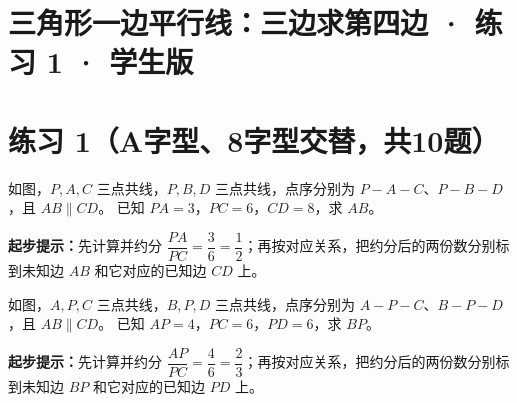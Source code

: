 \documentclass{exam-zh}
\begin{document}
\section*{三角形一边平行线：三边求第四边 · 练习 1 · 学生版}

\section*{练习 1（A字型、8字型交替，共10题）}


\begin{problem}[points=10]
  \noindent
  \begin{minipage}[t]{\dimexpr\linewidth-60mm-6mm\relax}
    \vspace{0pt}
    如图，$P,A,C$ 三点共线，$P,B,D$ 三点共线，点序分别为 $P-A-C$、$P-B-D$，且 $AB\parallel CD$。
已知 $PA=3$，$PC=6$，$CD=8$，求 $AB$。
    \begin{hintbox}
\textbf{起步提示：}先计算并约分 $\dfrac{PA}{PC}=\dfrac{3}{6}=\dfrac{1}{2}$；再按对应关系，把约分后的两份数分别标到未知边 $AB$ 和它对应的已知边 $CD$ 上。\end{hintbox}

  \end{minipage}\hfill
  \begin{diagramcoltikz}{60mm}{先看平行边方向，再判断 A 字型或 8 字型及对应边。}
  }
  \end{diagramcoltikz}
  \par\medskip
  \answerarea[42mm]
\end{problem}



\begin{problem}[points=10]
  \noindent
  \begin{minipage}[t]{\dimexpr\linewidth-60mm-6mm\relax}
    \vspace{0pt}
    如图，$A,P,C$ 三点共线，$B,P,D$ 三点共线，点序分别为 $A-P-C$、$B-P-D$，且 $AB\parallel CD$。
已知 $AP=4$，$PC=6$，$PD=6$，求 $BP$。
    \begin{hintbox}
\textbf{起步提示：}先计算并约分 $\dfrac{AP}{PC}=\dfrac{4}{6}=\dfrac{2}{3}$；再按对应关系，把约分后的两份数分别标到未知边 $BP$ 和它对应的已知边 $PD$ 上。\end{hintbox}

  \end{minipage}\hfill
  \begin{diagramcoltikz}{60mm}{先看平行边方向，再判断 A 字型或 8 字型及对应边。}
  }
  \end{diagramcoltikz}
  \par\medskip
  \answerarea[42mm]
\end{problem}
\end{document}

